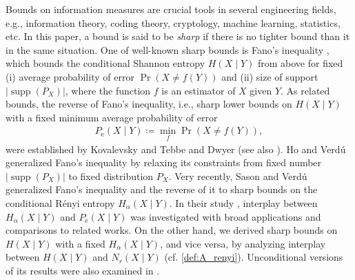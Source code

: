 \documentclass[conference, draftcls, onecolumn]{IEEEtran}
\theoremstyle{plain}
\newcommand{\supp}{\operatorname{supp}}
\begin{document}
Bounds on information measures are crucial tools in several engineering fields, e.g., information theory, coding theory, cryptology, machine learning, statistics, etc.
In this paper, a bound is said to be \emph{sharp} if there is no tighter bound than it in the same situation.
One of well-known sharp bounds is Fano's inequality \cite{fano}, which bounds the conditional Shannon entropy $H(X \mid Y)$ from above for fixed (i) average probability of error $\Pr(X \neq f(Y))$ and (ii) size of support $|\!\supp( P_{X} )|$, where the function $f$ is an estimator of $X$ given $Y$.
As related bounds, the reverse of Fano's inequality, i.e., sharp lower bounds on $H(X \mid Y)$ with a fixed minimum average probability of error
\begin{align}
P_{\mathrm{e}}(X \mid Y)
\coloneqq
\min_{f} \Pr(X \neq f(Y)) ,
\label{def:Pe}
\end{align}
were established by Kovalevsky \cite{kovalevsky} and Tebbe and Dwyer \cite{tebbe} (see also \cite{feder}).
Ho and Verd\'{u} \cite{verdu} generalized Fano's inequality by relaxing its constraints from fixed number $|\!\supp( P_{X} )|$ to fixed distribution $P_{X}$.
Very recently, Sason and Verd\'{u} \cite{sason} generalized Fano's inequality and the reverse of it to sharp bounds on the conditional R\'{e}nyi entropy $H_{\alpha}(X \mid Y)$.
In their study \cite{sason}, interplay between $H_{\alpha}(X \mid Y)$ and $P_{\mathrm{e}}(X \mid Y)$ was investigated with broad applications and comparisons to related works.
On the other hand, we \cite{part2} derived sharp bounds on $H(X \mid Y)$ with a fixed $H_{\alpha}(X \mid Y)$, and vice versa, by analyzing interplay between $H(X \mid Y)$ and $N_{r}(X \mid Y)$ (cf. \eqref{def:A_renyi}).
Unconditional versions of its results \cite{part2} were also examined in \cite{part1}.
\end{document}
